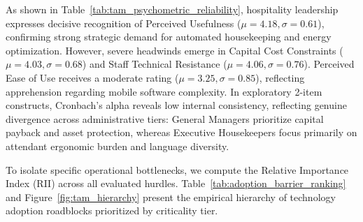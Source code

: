 \documentclass[11pt,a4paper]{article}
\begin{document}
As shown in Table~\ref{tab:tam_psychometric_reliability}, hospitality leadership expresses decisive recognition of Perceived Usefulness ($\mu = 4.18, \sigma = 0.61$), confirming strong strategic demand for automated housekeeping and energy optimization. However, severe headwinds emerge in Capital Cost Constraints ($\mu = 4.03, \sigma = 0.68$) and Staff Technical Resistance ($\mu = 4.06, \sigma = 0.76$). Perceived Ease of Use receives a moderate rating ($\mu = 3.25, \sigma = 0.85$), reflecting apprehension regarding mobile software complexity. In exploratory 2-item constructs, Cronbach's alpha reveals low internal consistency, reflecting genuine divergence across administrative tiers: General Managers prioritize capital payback and asset protection, whereas Executive Housekeepers focus primarily on attendant ergonomic burden and language diversity.

To isolate specific operational bottlenecks, we compute the Relative Importance Index (RII) across all evaluated hurdles. Table~\ref{tab:adoption_barrier_ranking} and Figure~\ref{fig:tam_hierarchy} present the empirical hierarchy of technology adoption roadblocks prioritized by criticality tier.

\begin{table}[H]
\centering
\small
\caption{Adoption barrier hierarchy prioritized via Relative Importance Index (RII) across $N=32$ respondents.}
\label{tab:adoption_barrier_ranking}
\end{table}
\end{document}
